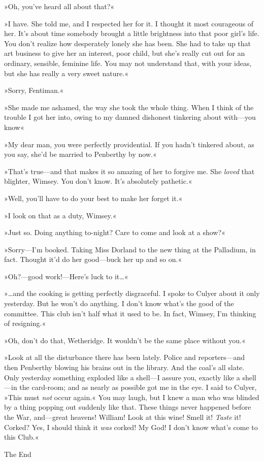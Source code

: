 »Oh, you've heard all about that?«

»I have. She told me, and I respected her for it. I thought it most courageous of her. It's about time somebody brought a little brightness into that poor girl's life. You don't realize how desperately lonely she has been. She had to take up that art business to give her an interest, poor child, but she's really cut out for an ordinary, sensible, feminine life. You may not understand that, with your ideas, but she has really a very sweet nature.«

»Sorry, Fentiman.«

»She made me ashamed, the way she took the whole thing. When I think of the trouble I got her into, owing to my damned dishonest tinkering about with—you know\longdash«

»My dear man, you were perfectly providential. If you hadn't tinkered about, as you say, she'd be married to Penberthy by now.«

»That's true—and that makes it so amazing of her to forgive me. She \textit{loved} that blighter, Wimsey. You don't know. It's absolutely pathetic.«

»Well, you'll have to do your best to make her forget it.«

»I look on that as a duty, Wimsey.«

»Just so. Doing anything to-night? Care to come and look at a show?«

»Sorry—I'm booked. Taking Miss Dorland to the new thing at the Palladium, in fact. Thought it'd do her good—buck her up and so on.«

»Oh?—good work!—Here's luck to it\dots«

»\dots and the cooking is getting perfectly disgraceful. I spoke to Culyer about it only yesterday. But he won't do anything. I don't know what's the good of the committee. This club isn't half what it used to be. In fact, Wimsey, I'm thinking of resigning.«

»Oh, don't do that, Wetheridge. It wouldn't be the same place without you.«

»Look at all the disturbance there has been lately. Police and reporters—and then Penberthy blowing his brains out in the library. And the coal's all slate. Only yesterday something exploded like a shell—I assure you, exactly like a shell—in the card-room; and as nearly as possible got me in the eye. I said to Culyer, »This must \textit{not} occur again.« You may laugh, but I knew a man who was blinded by a thing popping out suddenly like that. These things never happened before the War, and—great heavens! William! Look at this wine! Smell it! \textit{Taste} it! Corked? Yes, I should think it \textit{was} corked! My God! I don't know what's come to this Club.«
\vfill
\begin{center}
{\mytitlefont\moderatelyhuge The End}
\end{center}